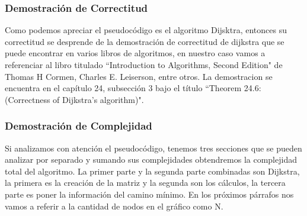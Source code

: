 \documentclass[spanish,12pt]{article}
\begin{document}
\newpage

\subsubsection{Demostración de Correctitud}
Como podemos apreciar el pseudocódigo es el algoritmo Dijsktra, entonces su correctitud se desprende de la demostración de correctitud de dijkstra que se puede encontrar en varios libros de algoritmos, en nuestro caso vamos a referenciar al libro titulado ``Introduction to Algorithms, Second Edition"  de Thomas H Cormen, Charles E. Leiserson, entre otros. La demostracion se encuentra en el capítulo 24, subsección 3 bajo el título ``Theorem 24.6: (Correctness of Dijkstra's algorithm)".

\subsubsection{Demostración de Complejidad}

Si analizamos con atención el pseudocódigo, tenemos tres secciones que se pueden analizar por separado y sumando sus complejidades obtendremos la complejidad total del algoritmo. La primer parte y la segunda parte combinadas son Dijkstra, la primera es la creación de la matriz y la segunda son los cálculos, la tercera parte es poner la información del camino mínimo. En los próximos párrafos nos vamos a referir a la cantidad de nodos en el gráfico como N.
\end{document}
